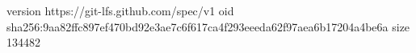 version https://git-lfs.github.com/spec/v1
oid sha256:9aa82ffc897ef470bd92e3ae7c6f617ca4f293eeeda62f97aea6b17204a4be6a
size 134482
